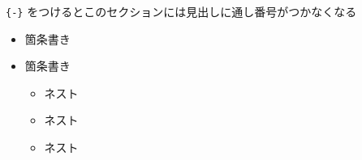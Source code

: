 \documentclass[
  10pt,
  a4paper,
  pandoc,
  titlepage]{ltjsarticle}
\providecommand{\tightlist}{%
  \setlength{\itemsep}{0pt}\setlength{\parskip}{0pt}}
\begin{document}
\passthrough{\lstinline!\{-\}!}
をつけるとこのセクションには見出しに通し番号がつかなくなる

\begin{itemize}
\tightlist
\item
  箇条書き
\item
  箇条書き

  \begin{itemize}
  \tightlist
  \item
    ネスト
  \item
    ネスト
  \item
    ネスト
  \end{itemize}
\end{itemize}
\end{document}
